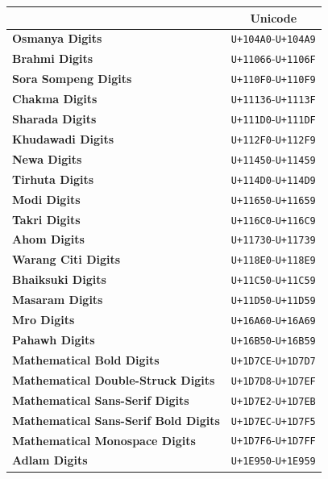 \documentclass [10pt]{article}
\begin{document}
\begin{center}
  \begin{tabular}{|l|c|}
    \hline
    & \textbf{Unicode} \\ \hline
    \textbf{Osmanya Digits} & \texttt{U+104A0}-\texttt{U+104A9} \\ \hline
    \textbf{Brahmi Digits} & \texttt{U+11066}-\texttt{U+1106F} \\ \hline
    \textbf{Sora Sompeng Digits} & \texttt{U+110F0}-\texttt{U+110F9} \\ \hline
    \textbf{Chakma Digits} & \texttt{U+11136}-\texttt{U+1113F} \\ \hline
    \textbf{Sharada Digits} & \texttt{U+111D0}-\texttt{U+111DF} \\ \hline
    \textbf{Khudawadi Digits} & \texttt{U+112F0}-\texttt{U+112F9} \\ \hline
    \textbf{Newa Digits} & \texttt{U+11450}-\texttt{U+11459} \\ \hline
    \textbf{Tirhuta Digits} & \texttt{U+114D0}-\texttt{U+114D9} \\ \hline
    \textbf{Modi Digits} & \texttt{U+11650}-\texttt{U+11659} \\ \hline
    \textbf{Takri Digits} & \texttt{U+116C0}-\texttt{U+116C9} \\ \hline
    \textbf{Ahom Digits} & \texttt{U+11730}-\texttt{U+11739} \\ \hline
    \textbf{Warang Citi Digits} & \texttt{U+118E0}-\texttt{U+118E9} \\ \hline
    \textbf{Bhaiksuki Digits} & \texttt{U+11C50}-\texttt{U+11C59} \\ \hline
    \textbf{Masaram Digits} & \texttt{U+11D50}-\texttt{U+11D59} \\ \hline
    \textbf{Mro Digits} & \texttt{U+16A60}-\texttt{U+16A69} \\ \hline
    \textbf{Pahawh Digits} & \texttt{U+16B50}-\texttt{U+16B59} \\ \hline
    \textbf{Mathematical Bold Digits}
    & \texttt{U+1D7CE}-\texttt{U+1D7D7} \\ \hline
    \textbf{Mathematical Double-Struck Digits}
    & \texttt{U+1D7D8}-\texttt{U+1D7EF} \\ \hline
    \textbf{Mathematical Sans-Serif Digits}
    & \texttt{U+1D7E2}-\texttt{U+1D7EB} \\ \hline
    \textbf{Mathematical Sans-Serif Bold Digits}
    & \texttt{U+1D7EC}-\texttt{U+1D7F5} \\ \hline
    \textbf{Mathematical Monospace Digits}
    & \texttt{U+1D7F6}-\texttt{U+1D7FF} \\ \hline
    \textbf{Adlam Digits}
    & \texttt{U+1E950}-\texttt{U+1E959} \\ \hline
  \end{tabular}
\end{center}
\end{document}
